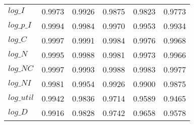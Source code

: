 \begin{center}
\begin{longtable}{lccccc}
$log\_I     $	 & 	    0.9973	 & 	    0.9926	 & 	    0.9875	 & 	    0.9823	 & 	    0.9773 \\ 
$log\_p\_I  $	 & 	    0.9994	 & 	    0.9984	 & 	    0.9970	 & 	    0.9953	 & 	    0.9934 \\ 
$log\_C     $	 & 	    0.9997	 & 	    0.9991	 & 	    0.9984	 & 	    0.9976	 & 	    0.9968 \\ 
$log\_N     $	 & 	    0.9995	 & 	    0.9988	 & 	    0.9981	 & 	    0.9973	 & 	    0.9966 \\ 
$log\_NC    $	 & 	    0.9997	 & 	    0.9993	 & 	    0.9988	 & 	    0.9983	 & 	    0.9977 \\ 
$log\_NI    $	 & 	    0.9981	 & 	    0.9954	 & 	    0.9926	 & 	    0.9900	 & 	    0.9875 \\ 
$log\_util  $	 & 	    0.9942	 & 	    0.9836	 & 	    0.9714	 & 	    0.9589	 & 	    0.9465 \\ 
$log\_D     $	 & 	    0.9916	 & 	    0.9828	 & 	    0.9742	 & 	    0.9658	 & 	    0.9578 \\ 
\end{longtable}
 \end{center}
